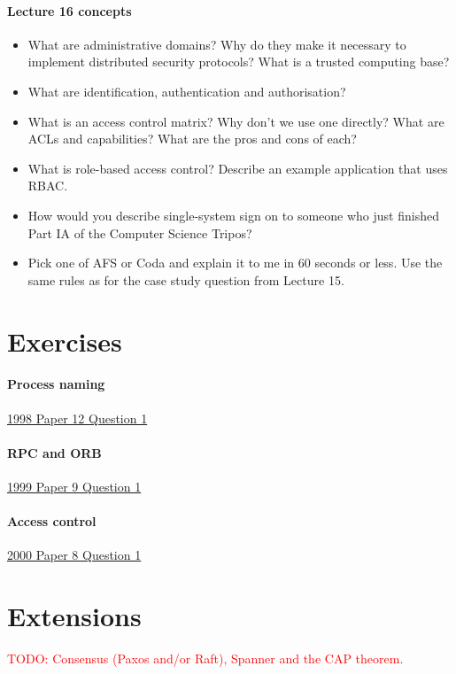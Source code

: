 \documentclass[12pt,a4paper,oneside,openright]{report}
\newcommand{\question}[2]{\paragraph{#1} #2}
\newcommand{\todo}[1]{\textcolor{red}{TODO: #1}}
\begin{document}
\question{Lecture 16 concepts}{
  \begin{itemize}
  \item What are administrative domains? Why do they make it necessary
    to implement distributed security protocols? What is a trusted
    computing base?
  \item What are identification, authentication and authorisation?
  \item What is an access control matrix? Why don't we use one
    directly? What are ACLs and capabilities? What are the pros and
    cons of each?
  \item What is role-based access control? Describe an example
    application that uses RBAC.
  \item How would you describe single-system sign on to someone who
    just finished Part IA of the Computer Science Tripos?
  \item Pick one of AFS or Coda and explain it to me in 60 seconds or
    less. Use the same rules as for the case study question from
    Lecture 15.
  \end{itemize}
}

\section{Exercises}


\question{Process
  naming}{\href{https://www.cl.cam.ac.uk/teaching/exams/pastpapers/y1998p12q1.pdf}{1998
    Paper 12 Question 1}}

\question{RPC and
  ORB}{\href{https://www.cl.cam.ac.uk/teaching/exams/pastpapers/y1999p9q1.pdf}{1999
    Paper 9 Question 1}}

\question{Access
  control}{\href{https://www.cl.cam.ac.uk/teaching/exams/pastpapers/y2000p8q1.pdf}{2000
    Paper 8 Question 1}}

\section{Extensions}

\todo{Consensus (Paxos and/or Raft), Spanner and the CAP theorem.}




\end{document}
